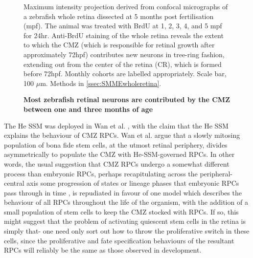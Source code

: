 \documentclass{ut-thesis}
\begin{document}
\begin{NoHyper}
\begin{figure}[!h]
\caption{{\bf Most zebrafish retinal neurons are contributed by the CMZ between one and three months of age}}
Maximum intensity projection derived from confocal micrographs of a zebrafish whole retina dissected at 5 months post fertilisation (mpf). The animal was treated with BrdU at 1, 2, 3, 4, and 5 mpf for 24hr. Anti-BrdU staining of the whole retina reveals the extent to which the CMZ (which is responsible for retinal growth after approximately 72hpf) contributes new neurons in tree-ring fashion, extending out from the center of the retina (CR), which is formed before 72hpf. Monthly cohorts are labelled appropriately. Scale bar, 100 $\mu$m.
Methods in \autoref{ssec:SMMEwholeretina}.
\label{RingFig}
\end{figure}

\FloatBarrier

The He SSM was deployed in Wan et al. \cite{Wan2016}, with the claim that the He SSM explains the behaviour of CMZ RPCs. Wan et al. argue that a slowly mitosing population of bona fide stem cells, at the utmost retinal periphery, divides asymmetrically to populate the CMZ with He-SSM-governed RPCs. In other words, the usual suggestion that CMZ RPCs undergo a somewhat different process than embryonic RPCs, perhaps recapitulating across the peripheral-central axis some progression of states or lineage phases that embryonic RPCs pass through in time \cite{Harris1998}, is repudiated in favour of one model which describes the behaviour of all RPCs throughout the life of the organism, with the addition of a small population of stem cells to keep the CMZ stocked with RPCs. If so, this might suggest that the problem of activating quiescent stem cells in the retina is simply that- one need only sort out how to throw the proliferative switch in these cells, since the proliferative and fate specification behaviours of the resultant RPCs will reliably be the same as those observed in development.


\end{NoHyper}
\end{document}
